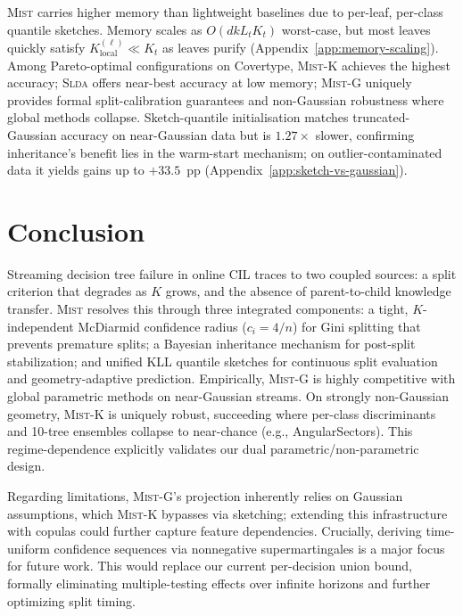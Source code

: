 \documentclass{article}
\newcommand{\mist}{\textsc{Mist}}
\newcommand{\slda}{\textsc{Slda}}
\begin{document}
\mist{} carries higher memory than lightweight baselines due to per-leaf,
per-class quantile sketches. Memory scales as $O(dkL_tK_t)$ worst-case,
but most leaves quickly satisfy $K_{\mathrm{local}}^{(\ell)} \ll K_t$ as
leaves purify (Appendix~\ref{app:memory-scaling}). Among Pareto-optimal
configurations on Covertype, \mist{}-K achieves the highest accuracy;
\slda{} offers near-best accuracy at low memory; \mist{}-G uniquely
provides formal split-calibration guarantees and non-Gaussian robustness
where global methods collapse. Sketch-quantile initialisation matches
truncated-Gaussian accuracy on near-Gaussian data but is $1.27\times$
slower, confirming inheritance's benefit lies in the warm-start mechanism;
on outlier-contaminated data it yields gains up to $+33.5$~pp
(Appendix~\ref{app:sketch-vs-gaussian}).


\vspace{-0.2cm}
\section{Conclusion}
\label{sec:conclusion}
Streaming decision tree failure in online CIL traces to two coupled sources: a split criterion that degrades as $K$ grows, and the absence of parent-to-child knowledge transfer. \mist{} resolves this through three integrated components: a tight, $K$-independent McDiarmid confidence radius ($c_i{=}4/n$) for Gini splitting that prevents premature splits; a Bayesian inheritance mechanism for post-split stabilization; and unified KLL quantile sketches for continuous split evaluation and geometry-adaptive prediction.
%
Empirically, \mist{}-G is highly competitive with global parametric methods on near-Gaussian streams. On strongly non-Gaussian geometry, \mist{}-K is uniquely robust, succeeding where per-class discriminants and 10-tree ensembles collapse to near-chance (e.g., AngularSectors). This regime-dependence explicitly validates our dual parametric/non-parametric design.

Regarding limitations, \mist{}-G's projection inherently relies on Gaussian assumptions, which \mist{}-K bypasses via sketching; extending this infrastructure with copulas could further capture feature dependencies. Crucially, deriving time-uniform confidence sequences via nonnegative supermartingales \citep{Howard2021} is a major focus for future work. This would replace our current per-decision union bound, formally eliminating multiple-testing effects over infinite horizons and further optimizing split timing.
\end{document}

